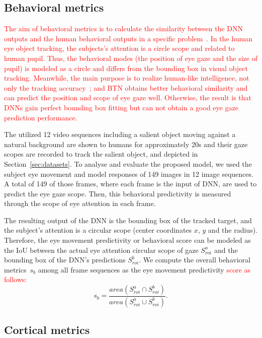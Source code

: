 \documentclass[final,3p,times,twocolumn]{elsarticle}
\begin{document}
\subsection{Behavioral metrics}
\textcolor{red}{
The aim of behavioral metrics is to calculate the similarity between the DNN outputs and the human behavioral outputs in a specific problem~\cite{rajalingham2018large}. 
In the human eye object tracking, the subjects's attention is a circle scope and related to human pupil.
Thus, the behavioral modes (the position of eye gaze and the size of pupil) is modeled as a circle and differs from the bounding box in visual object tracking. 
Meanwhile, the main purpose is to realize human-like intelligence, not only the tracking accuracy~\cite{schrimpf2020integrative}; 
and BTN obtains better behavioral similarity and can predict the position and scope of eye gaze well. 
Otherwise, the result is that DNNs gain perfect bounding box fitting but can not obtain a good eye gaze prediction performance. 
}

The utilized 12 video sequences including a salient object moving against a natural background are shown to humans for approximately 20s 
and their gaze scopes are recorded to track the salient object, and depicted in Section~\ref{sec:datasets}. 
To analyse and evaluate the proposed model, we used the subject eye movement and model responses of 149 images in 12 image sequences.
A total of 149 of those frames, where each frame is the input of DNN, are used to predict the eye gaze scope.
Then, this behavioral predictivity is measured through the scope of eye attention in each frame. 

The resulting output of the DNN is the bounding box of the tracked target, 
and the subject's attention is a circular scope (center coordinates $x$, $y$ and the radius).
Therefore, the eye movement predictivity or behavioral score can be modeled as the IoU between the actual eye attention circular scope of gaze $S_{roi}^a$ and the bounding box of the DNN's predictions $S_{roi}^b$. 
We compute the overall behavioral metrics~$s_b$ among all frame sequences as the eye movement predictivity \textcolor{red}{score as follows:} 
\begin{equation}
s_b=\frac{area(S_{roi}^a \cap S_{roi}^b) }  { area(S_{roi}^a \cup S_{roi}^b) }.
\end{equation}


\subsection{Cortical metrics}
\label{sec:neural-pred}
\end{document}
